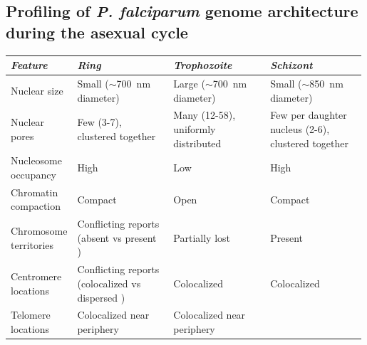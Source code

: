 \subsection{Profiling of \textit{P. falciparum} genome architecture during the asexual
cycle}

\begin{table}
\renewcommand{\arraystretch}{1.5}
\begin{tabular}{p{0.15\linewidth}p{0.28\linewidth}p{0.28\linewidth}p{0.28\linewidth}}
\hline
\textit{Feature} & \textit{Ring} & \textit{Trophozoite} & \textit{Schizont} \\
\hline
Nuclear size & Small ($\sim$700~nm diameter) {\small \citep{weiner:3d, bannister:making}}
& Large ($\sim$700~nm diameter) {\small \citep{weiner:3d, bannister:making}}
& Small ($\sim$850~nm diameter) {\small \citep{weiner:3d, bannister:making}}
\\ Nuclear pores
& Few (3-7), clustered together {\small \citep{weiner:3d}}
& Many (12-58), uniformly distributed {\small \citep{weiner:3d}}
& Few per daughter nucleus (2-6), clustered together {\small \citep{weiner:3d}}
\\ Nucleosome occupancy
& High {\small \citep{bunnik:DNA-encoded, ponts:nucleosome}}
& Low {\small \citep{bunnik:DNA-encoded, ponts:nucleosome}}
& High {\small \citep{bunnik:DNA-encoded, ponts:nucleosome}}
\\ Chromatin compaction
& Compact {\small \citep{ay:three-dimensional, bunnik:DNA-encoded, ponts:nucleosome, weiner:3d}}
&  Open {\small \citep{ay:three-dimensional, bunnik:DNA-encoded, ponts:nucleosome, weiner:3d}}
& Compact {\small \citep{ay:three-dimensional, bunnik:DNA-encoded, ponts:nucleosome, weiner:3d}}
\\ Chromosome territories
& Conflicting reports (absent {\small \citep{lemieux:genome-wide}} vs present {\small \citep{ay:three-dimensional}})
& Partially lost {\small \citep{ay:three-dimensional}}
& Present {\small \citep{ay:three-dimensional}}
\\ Centromere locations
& Conflicting reports (colocalized {\small \citep{ay:three-dimensional}} vs dispersed {\small \citep{lemieux:genome-wide, hoeijmakers:plasmodium}})
& Colocalized {\small \citep{ay:three-dimensional, hoeijmakers:plasmodium}}
& Colocalized {\small \citep{ay:three-dimensional, hoeijmakers:plasmodium}}
\\ Telomere locations
& Colocalized near periphery {\small \citep{ay:three-dimensional, freitas-junior:frequent}}
& Colocalized near periphery {\small \citep{ay:three-dimensional, freitas-junior:frequent}}

\end{tabular}
\end{table}
